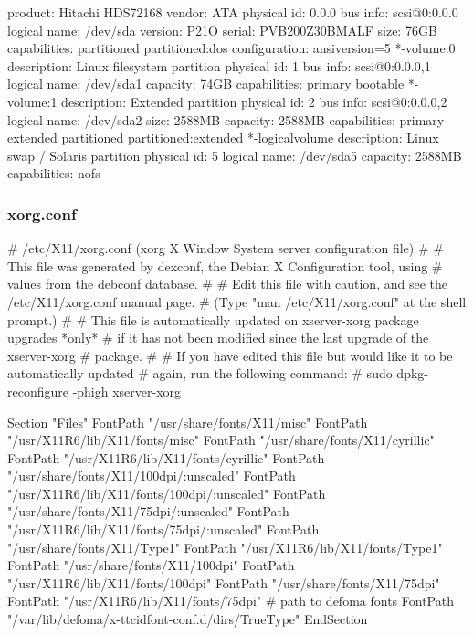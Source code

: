 \documentclass[mingoth,a4paper]{jsarticle}
\begin{document}
{{{{{{{{{{{{{{\begin{commandline}
                product: Hitachi HDS72168
                vendor: ATA
                physical id: 0.0.0
                bus info: scsi@0:0.0.0
                logical name: /dev/sda
                version: P21O
                serial: PVB200Z30BMALF
                size: 76GB
                capabilities: partitioned partitioned:dos
                configuration: ansiversion=5
              *-volume:0
                   description: Linux filesystem partition
                   physical id: 1
                   bus info: scsi@0:0.0.0,1
                   logical name: /dev/sda1
                   capacity: 74GB
                   capabilities: primary bootable
              *-volume:1
                   description: Extended partition
                   physical id: 2
                   bus info: scsi@0:0.0.0,2
                   logical name: /dev/sda2
                   size: 2588MB
                   capacity: 2588MB
                   capabilities: primary extended partitioned partitioned:extended
                 *-logicalvolume
                      description: Linux swap / Solaris partition
                      physical id: 5
                      logical name: /dev/sda5
                      capacity: 2588MB
                      capabilities: nofs
\end{commandline}

\subsubsection{xorg.conf}

\begin{commandline}
# /etc/X11/xorg.conf (xorg X Window System server configuration file)
#
# This file was generated by dexconf, the Debian X Configuration tool, using
# values from the debconf database.
#
# Edit this file with caution, and see the /etc/X11/xorg.conf manual page.
# (Type "man /etc/X11/xorg.conf" at the shell prompt.)
#
# This file is automatically updated on xserver-xorg package upgrades *only*
# if it has not been modified since the last upgrade of the xserver-xorg
# package.
#
# If you have edited this file but would like it to be automatically updated
# again, run the following command:
#   sudo dpkg-reconfigure -phigh xserver-xorg

Section "Files"
	FontPath	"/usr/share/fonts/X11/misc"
	FontPath	"/usr/X11R6/lib/X11/fonts/misc"
	FontPath	"/usr/share/fonts/X11/cyrillic"
	FontPath	"/usr/X11R6/lib/X11/fonts/cyrillic"
	FontPath	"/usr/share/fonts/X11/100dpi/:unscaled"
	FontPath	"/usr/X11R6/lib/X11/fonts/100dpi/:unscaled"
	FontPath	"/usr/share/fonts/X11/75dpi/:unscaled"
	FontPath	"/usr/X11R6/lib/X11/fonts/75dpi/:unscaled"
	FontPath	"/usr/share/fonts/X11/Type1"
	FontPath	"/usr/X11R6/lib/X11/fonts/Type1"
	FontPath	"/usr/share/fonts/X11/100dpi"
	FontPath	"/usr/X11R6/lib/X11/fonts/100dpi"
	FontPath	"/usr/share/fonts/X11/75dpi"
	FontPath	"/usr/X11R6/lib/X11/fonts/75dpi"
	# path to defoma fonts
	FontPath	"/var/lib/defoma/x-ttcidfont-conf.d/dirs/TrueType"
EndSection


\end{commandline}}}}}}}}}}}}}}}
\end{document}
